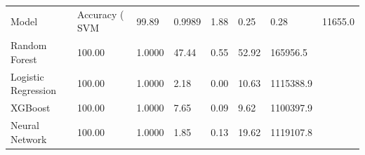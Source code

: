 \begin{tabular}{lllllll}
\toprule
Model & Accuracy (%
\midrule
SVM & 99.89 & 0.9989 & 1.88 & 0.25 & 0.28 & 11655.0 \\
Random Forest & 100.00 & 1.0000 & 47.44 & 0.55 & 52.92 & 165956.5 \\
Logistic Regression & 100.00 & 1.0000 & 2.18 & 0.00 & 10.63 & 1115388.9 \\
XGBoost & 100.00 & 1.0000 & 7.65 & 0.09 & 9.62 & 1100397.9 \\
Neural Network & 100.00 & 1.0000 & 1.85 & 0.13 & 19.62 & 1119107.8 \\
\bottomrule
\end{tabular}
